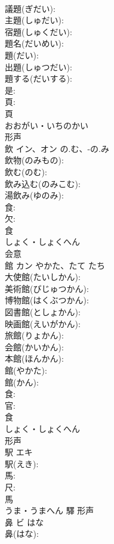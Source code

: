 \documentclass[8pt]{extreport}
\begin{document}
\begin{CJK}{UTF8}{min}
\\	議題(ぎだい): 
\\	主題(しゅだい): 
\\	宿題(しゅくだい): 
\\	題名(だいめい): 
\\	題(だい): 
\\	出題(しゅつだい): 
\\	題する(だいする): 
\\	是: 
\\	頁: 
\\	頁	
\\	おおがい・いちのかい	
\\	形声 
\\	飲	イン、オン	の.む、-の.み		
\\	飲物(のみもの): 
\\	飲む(のむ): 
\\	飲み込む(のみこむ): 
\\	湯飲み(ゆのみ): 
\\	食: 
\\	欠: 
\\	食	
\\	しょく・しょくへん	
\\	会意 
\\	館	カン	やかた、たて	たち	
\\	大使館(たいしかん): 
\\	美術館(びじゅつかん): 
\\	博物館(はくぶつかん): 
\\	図書館(としょかん): 
\\	映画館(えいがかん): 
\\	旅館(りょかん): 
\\	会館(かいかん): 
\\	本館(ほんかん): 
\\	館(やかた): 
\\	館(かん): 
\\	食: 
\\	官: 
\\	食	
\\	しょく・しょくへん	
\\	形声 
\\	駅	エキ			
\\	駅(えき): 
\\	馬: 
\\	尺: 
\\	馬	
\\	うま・うまへん	驛	形声 
\\	鼻	ビ	はな		
\\	鼻(はな): 

\end{CJK}
\end{document}
